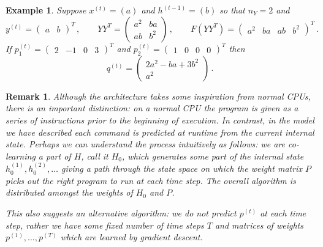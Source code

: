 \documentclass[english,letter paper,12pt,leqno]{article}
\theoremstyle{example}
\newtheorem{example}[theorem]{Example}
\newtheorem{remark}[theorem]{Remark}
\numberwithin{equation}{section}
\begin{document}
\begin{example} Suppose $x^{(t)} = ( a )$ and $h^{(t-1)} = ( b )$ so that $n_Y = 2$ and
\[
y^{(t)} = \begin{pmatrix} a & b \end{pmatrix}^T\,, \qquad Y Y^T = \begin{pmatrix} a^2 & ba \\ ab & b^2 \end{pmatrix}\,, \qquad F( Y Y^T ) = \begin{pmatrix} a^2 & ba & ab & b^2 \end{pmatrix}^T\,.
\]
If $p^{(t)}_1 = \begin{pmatrix} 2 & -1 & 0 & 3 \end{pmatrix}^T$ and $p^{(t)}_2 = \begin{pmatrix} 1 & 0 & 0 & 0 \end{pmatrix}^T$ then
\[
q^{(t)} = \begin{pmatrix} 2a^2 - ba + 3b^2 \\ a^2 \end{pmatrix}\,.
\]
\end{example}

\begin{remark} Although the architecture takes some inspiration from normal CPUs, there is an important distinction: on a normal CPU the program is given as a series of instructions prior to the beginning of execution. In contrast, in the model we have described each command is \emph{predicted} at runtime from the current internal state. Perhaps we can understand the process intuitively as follows: we are co-learning a part of $H$, call it $H_0$, which generates some part of the internal state $h^{(1)}_{0}, h^{(2)}_{0}, \ldots$ giving a path through the state space on which the weight matrix $P$ picks out the right program to run at each time step. The overall algorithm is distributed amongst the weights of $H_0$ and $P$.

This also suggests an alternative algorithm: we do not predict $p^{(t)}$ at each time step, rather we have some fixed number of time steps $T$ and matrices of weights $p^{(1)}, \ldots, p^{(T)}$ which are learned by gradient descent.
\end{remark}
\end{document}
